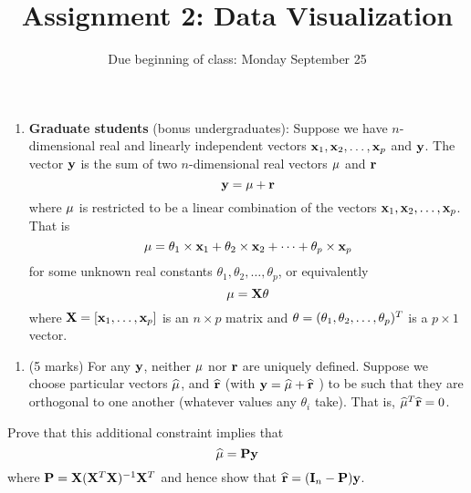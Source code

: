 \documentclass[9pt,letter]{article}
\title{Assignment 2: Data Visualization}
\subtitle{Due beginning of class: Monday September 25}
\author{}
\date{}
\providecommand{\tightlist}{%
  \setlength{\itemsep}{0pt}\setlength{\parskip}{0pt}}
\begin{document}
\maketitle

\begin{enumerate}
\def\labelenumi{\arabic{enumi}.}
\setcounter{enumi}{5}
\tightlist
\item
  \textbf{Graduate students} (bonus undergraduates): Suppose we have
  \(n\)-dimensional real and linearly independent vectors
  \({\bf x}_1, {\bf x}_2, \ldots , {\bf x}_p\) and \({\bf y}\). The
  vector \({\bf y}\) is the sum of two \(n\)-dimensional real vectors
  \({\bf \mu}\) and \({\bf r}\) \[ {\bf y} = {\bf \mu} + {\bf r} \]
  where \({\bf \mu}\) is restricted to be a linear combination of the
  vectors \({\bf x}_1, {\bf x}_2, \ldots , {\bf x}_p\). That is
  \[ {\bf \mu} = \theta_1 \times {\bf x}_1 + \theta_2 \times {\bf x}_2 + \cdots  + \theta_p \times{\bf x}_p\]
  for some unknown real constants
  \(\theta_1, \theta_2, \ldots, \theta_p\), or equivalently
  \[  {\bf \mu}  = {\bf X}{\bf \theta}\] where
  \({\bf X} = [ {\bf x}_1, \ldots, {\bf x}_p]\) is an \(n \times p\)
  matrix and \({\bf \theta} = (\theta_1, \theta_2, \ldots, \theta_p)^T\)
  is a \(p \times 1\) vector.
\end{enumerate}

\begin{enumerate}
\def\labelenumi{(\alph{enumi})}
\tightlist
\item
  (5 marks) For any \({\bf y}\), neither \({\bf \mu}\) nor \({\bf r}\)
  are uniquely defined. Suppose we choose particular vectors
  \(\widehat{\bf \mu}\), and \(\widehat{\bf r}\) (with
  \({\bf y} = \widehat{\bf \mu} + \widehat{\bf r}~\)) to be such that
  they are orthogonal to one another (whatever values any \(\theta_i\)
  take). That is, \(\widehat{\bf \mu}^T \widehat{\bf r} = 0\).
\end{enumerate}

Prove that this additional constraint implies that
\[\widehat{\bf \mu} = {\bf P} {\bf y} \] where
\({\bf P} = {\bf X} ({\bf X}^T {\bf X})^{-1}{\bf X}^T\) and hence show
that \(\widehat{\bf r} = ({\bf I}_n -{\bf P}){\bf y}\).
\end{document}
